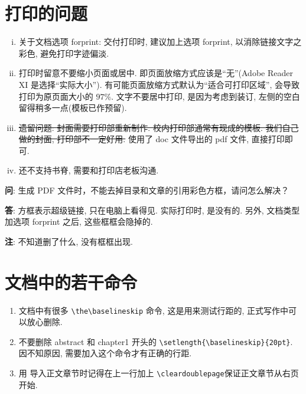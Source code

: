 
\section{打印的问题}
\begin{enumerate}[i)]
    \item  关于文档选项 forprint: 交付打印时, 建议加上选项 forprint, 以消除链接文字之彩色, 避免打印字迹偏淡.
    \item  打印时留意不要缩小页面或居中. 即页面放缩方式应该是``无''(Adobe Reader XI 是选择``实际大小'').
          有可能页面放缩方式默认为``适合可打印区域'', 会导致打印为原页面大小的 $97\%$.
          文字不要居中打印, 是因为考虑到装订, 左侧的空白留得稍多一点(模板已作预留). \the\baselineskip
    \item  \sout{遗留问题: 封面需要打印部重新制作.  校内打印部通常有现成的模板.
          我们自己做的封面, 打印部不一定好用.} 使用了 doc 文件导出的 pdf 文件, 直接打印即可.
    \item  还不支持书脊, 需要和打印店老板沟通.
\end{enumerate}

\textbf{问}: {\kaishu 生成 PDF 文件时，不能去掉目录和文章的引用彩色方框，请问怎么解决？\the\baselineskip} \the\baselineskip

\textbf{答}: {\kaishu 方框表示超级链接, 只在电脑上看得见. 实际打印时, 是没有的. 另外, 文档类型加选项 forprint 之后, 这些框框会隐掉的. }

\textbf{注}: {\kaishu 不知道删了什么, 没有框框出现.}

\section{文档中的若干命令 \the\baselineskip}
\begin{enumerate}
    \item 文档中有很多 \verb|\the\baselineskip| 命令, 这是用来测试行距的, 正式写作中可以放心删除.
    \item 不要删除 abstract 和 chapter1 开头的 \verb|\setlength{\baselineskip}{20pt}|. 因不知原因, 需要加入这个命令才有正确的行距.
    \item 用 \verb||导入正文章节时记得在上一行加上 \verb|\cleardoublepage|保证正文章节从右页开始.
\end{enumerate}
